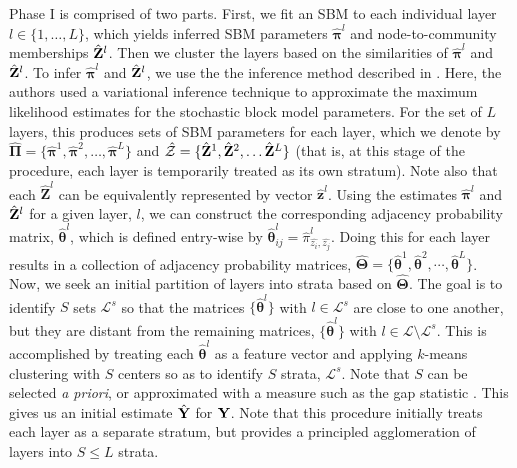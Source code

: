Phase I is comprised of two parts. First, we fit an SBM to each individual layer $l\in\{1,\dots,L\}$, which yields inferred SBM parameters $\hat{{\boldsymbol \pi}}^l$ and node-to-community memberships $\hat{{\bf Z}}^l$.
Then we cluster the layers based on the similarities of $\hat{{\boldsymbol \pi}}^l$ and $\hat{{\bf Z}}^l$. To infer $\hat{{\boldsymbol \pi}}^l$ and $\hat{{\bf Z}}^l$, we use the the inference method described in \cite{Dudin}. Here, the authors used a variational inference technique to approximate the maximum likelihood estimates for the stochastic block model parameters. For the set of $L$ layers, this produces sets of SBM parameters for each layer, which we denote by $\hat{\boldsymbol{\Pi}}=\{\hat{\boldsymbol{\pi}}^{1},\hat{\boldsymbol{\pi}}^{2}, \dots, \hat{\boldsymbol{\pi}}^{L}\}$ and $\hat{\mathcal{Z}}=\{\hat{\bf{Z}}^{1},\hat{\bf{Z}}^{2},\dots \hat{\bf{Z}}^{L}\}$ (that is, at this stage of the procedure, each layer is temporarily treated as its own stratum). Note also that each $\hat{{\boldsymbol Z}}^l$ can be equivalently represented by vector $\hat{{\boldsymbol z}}^l$. Using the estimates $\hat{{\boldsymbol \pi}}^{l}$ and $\hat{{\bf Z}}^{l}$ for a given layer, $l$, we can construct the corresponding adjacency probability matrix, $\hat{{\boldsymbol \theta}}^{l}$, which is defined entry-wise by $\hat{{\boldsymbol \theta}}_{ij}^{l}=\hat{\pi}_{\hat{z_{i}},\hat{z_{j}}}^l$. Doing this for each layer results in a collection of adjacency probability matrices, $\hat{\boldsymbol{\Theta}}=\{\hat{\boldsymbol{\theta}}^{1},\hat{\boldsymbol{\theta}}^{2}, \cdots, \hat{\boldsymbol{\theta}}^{L}\}$.\\
\indent Now, we seek an initial partition of layers into strata based on $\hat{\boldsymbol{\Theta}}$. The goal is to identify $S$ sets $\mathcal{L}^s$ so that the matrices $\{\hat{\boldsymbol{\theta}}^{l}\}$ with $l\in\mathcal{L}^s$ are close to one another, but they are distant from the remaining matrices, $\{\hat{\boldsymbol{\theta}}^{l}\}$ with $l\in\mathcal{L}\setminus \mathcal{L}^s$.
%
This is accomplished by treating each $\hat{\boldsymbol{\theta}}^{l}$ as a feature vector and applying $k$-means clustering with $S$ centers so as to identify $S$ strata, $\mathcal{L}^s$. Note that $S$ can be selected \emph{a priori}, or approximated with a measure such as the gap statistic \cite{gap}. This gives us an initial estimate $\hat{{\bf Y}}$ for ${\bf Y}$. Note that this procedure initially treats each layer as a separate stratum, but provides a principled agglomeration of layers into $S\le L$ strata.   

